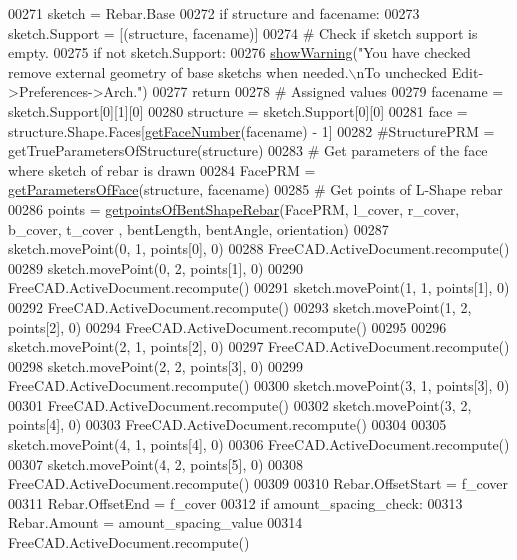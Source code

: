 \begin{DoxyCode}
00271     sketch = Rebar.Base
00272     \textcolor{keywordflow}{if} structure \textcolor{keywordflow}{and} facename:
00273         sketch.Support = [(structure, facename)]
00274     \textcolor{comment}{# Check if sketch support is empty.}
00275     \textcolor{keywordflow}{if} \textcolor{keywordflow}{not} sketch.Support:
00276         \hyperlink{namespaceRebarfunc_a2278a0602d46a62953af1fcf2e574a94}{showWarning}(\textcolor{stringliteral}{"You have checked remove external geometry of base sketchs when needed.\(\backslash\)nTo
       unchecked Edit->Preferences->Arch."})
00277         \textcolor{keywordflow}{return}
00278     \textcolor{comment}{# Assigned values}
00279     facename = sketch.Support[0][1][0]
00280     structure = sketch.Support[0][0]
00281     face = structure.Shape.Faces[\hyperlink{namespaceRebarfunc_a3885b3b63e3a41508ac79bc7550cf301}{getFaceNumber}(facename) - 1]
00282     \textcolor{comment}{#StructurePRM = getTrueParametersOfStructure(structure)}
00283     \textcolor{comment}{# Get parameters of the face where sketch of rebar is drawn}
00284     FacePRM = \hyperlink{namespaceRebarfunc_a92122b3d7cedd3d47bb63380a5ac4d08}{getParametersOfFace}(structure, facename)
00285     \textcolor{comment}{# Get points of L-Shape rebar}
00286     points = \hyperlink{namespaceBentShapeRebar_a33951a8ab21a73bae42af9f81d7c43c3}{getpointsOfBentShapeRebar}(FacePRM, l\_cover, r\_cover, b\_cover, t\_cover
      , bentLength, bentAngle, orientation)
00287     sketch.movePoint(0, 1, points[0], 0)
00288     FreeCAD.ActiveDocument.recompute()
00289     sketch.movePoint(0, 2, points[1], 0)
00290     FreeCAD.ActiveDocument.recompute()
00291     sketch.movePoint(1, 1, points[1], 0)
00292     FreeCAD.ActiveDocument.recompute()
00293     sketch.movePoint(1, 2, points[2], 0)
00294     FreeCAD.ActiveDocument.recompute()
00295 
00296     sketch.movePoint(2, 1, points[2], 0)
00297     FreeCAD.ActiveDocument.recompute()
00298     sketch.movePoint(2, 2, points[3], 0)
00299     FreeCAD.ActiveDocument.recompute()
00300     sketch.movePoint(3, 1, points[3], 0)
00301     FreeCAD.ActiveDocument.recompute()
00302     sketch.movePoint(3, 2, points[4], 0)
00303     FreeCAD.ActiveDocument.recompute()
00304 
00305     sketch.movePoint(4, 1, points[4], 0)
00306     FreeCAD.ActiveDocument.recompute()
00307     sketch.movePoint(4, 2, points[5], 0)
00308     FreeCAD.ActiveDocument.recompute()
00309 
00310     Rebar.OffsetStart = f\_cover
00311     Rebar.OffsetEnd = f\_cover
00312     \textcolor{keywordflow}{if} amount\_spacing\_check:
00313         Rebar.Amount = amount\_spacing\_value
00314         FreeCAD.ActiveDocument.recompute()

\end{DoxyCode}
